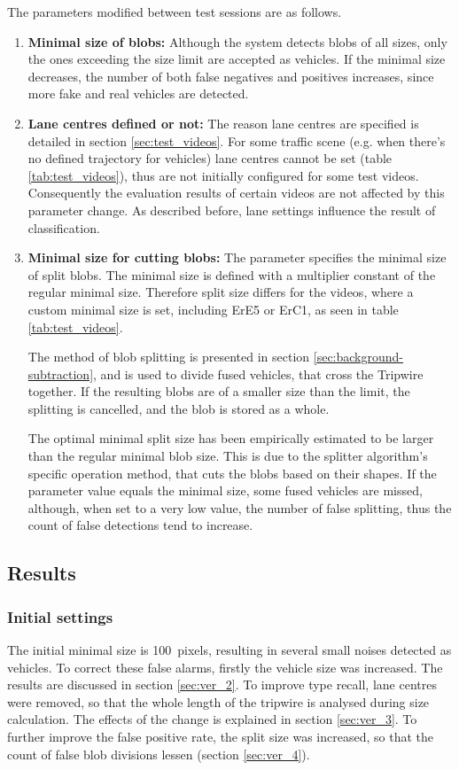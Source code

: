 \noindent The parameters modified between test sessions are as follows.
\begin{enumerate}
	\item \textbf{Minimal size of blobs:} Although the system detects blobs of all sizes, only the ones exceeding the size limit are accepted as vehicles. If the minimal size decreases, the number of both false negatives and positives increases, since more fake and real vehicles are detected.
	
	\item \textbf{Lane centres defined or not:} The reason lane centres are specified is detailed in section \ref{sec:test_videos}. For some traffic scene (e.g. when there's no defined trajectory for vehicles) lane centres cannot be set (table \ref{tab:test_videos}), thus are not initially configured for some test videos. Consequently the evaluation results of certain videos are not affected by this parameter change. As described before, lane settings influence the result of classification.
	
	\item \textbf{Minimal size for cutting blobs:} The parameter specifies the minimal size of split blobs. The minimal size is defined with a multiplier constant of the regular minimal size. Therefore split size differs for the videos, where a custom minimal size is set, including ErE5 or ErC1, as seen in table \ref{tab:test_videos}. 
	
	The method of blob splitting is presented in section \ref{sec:background-subtraction}, and is used to divide fused vehicles, that cross the Tripwire together. If the resulting blobs are of a smaller size than the limit, the splitting is cancelled, and the blob is stored as a whole. 
	
	The optimal minimal split size has been empirically estimated to be larger than the regular minimal blob size. This is due to the splitter algorithm's specific operation method, that cuts the blobs based on their shapes. If the parameter value equals the minimal size, some fused vehicles are missed, although, when set to a very low value, the number of false splitting, thus the count of false detections tend to increase.
\end{enumerate}

\subsection{Results}
\subsubsection{Initial settings}
The initial minimal size is \SI{100}{pixels}, resulting in several small noises detected as vehicles.
To correct these false alarms, firstly the vehicle size was increased.
The results are discussed in section \ref{sec:ver_2}.
To improve type recall, lane centres were removed, so that the whole length of the tripwire is analysed during size calculation. 
The effects of the change is explained in section \ref{sec:ver_3}.
To further improve the false positive rate, the split size was increased, so that the count of false blob divisions lessen (section \ref{sec:ver_4}).

